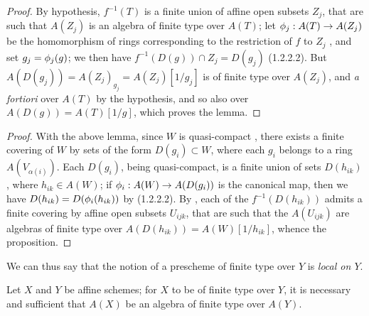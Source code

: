 \begin{proof}
\label{proof-1.6.3.2.1}
By hypothesis, $f^{-1}(T)$ is a finite union of affine open subsets $Z_j$, that are such that $A(Z_j)$ is an algebra of finite type over $A(T)$;
let $\vphi_j:A(T)\to A(Z_j)$ be the homomorphism of rings corresponding to the restriction of $f$ to $Z_j$ , and set $g_j=\phi_j(g)$;
we then have $f^{-1}(D(g))\cap Z_j=D(g_j)$ (1.2.2.2).
But $A(D(g_j))=A(Z_j)_{g_j}=A(Z_j)[1/g_j]$ is of finite type over $A(Z_j)$, and \emph{a fortiori} over $A(T)$ by the hypothesis, and so also over $A(D(g))=A(T)[1/g]$, which proves the lemma.
\end{proof}

\begin{proof}
\label{proof-1.6.3.2}
With the above lemma, since $W$ is quasi-compact , there exists a finite covering of $W$ by sets of the form $D(g_i)\subset W$, where each $g_i$ belongs to a ring $A(V_{\alpha(i)})$.
Each $D(g_i)$, being quasi-compact, is a finite union of sets $D(h_{ik})$, where $h_{ik}\in A(W)$;
if $\vphi_i:A(W)\to A(D(g_i))$ is the canonical map, then we have $D(h_{ik})=D(\phi_i(h_{ik}))$ by (1.2.2.2).
By , each of the $f^{-1}(D(h_{ik}))$ admits a finite covering by affine open subsets $U_{ijk}$, that are such that the $A(U_{ijk})$ are algebras of finite type over $A(D(h_{ik}))=A(W)[1/h_{ik}]$, whence the proposition.
\end{proof}

We
can thus say that the notion of a prescheme of finite type over $Y$ is \emph{local on $Y$}.

\begin{prop}[6.3.3]
\label{1.6.3.3}
Let $X$ and $Y$ be affine schemes;
for $X$ to be of finite type over $Y$, it is necessary and sufficient that $A(X)$ be an algebra of finite type over $A(Y)$.
\end{prop}

